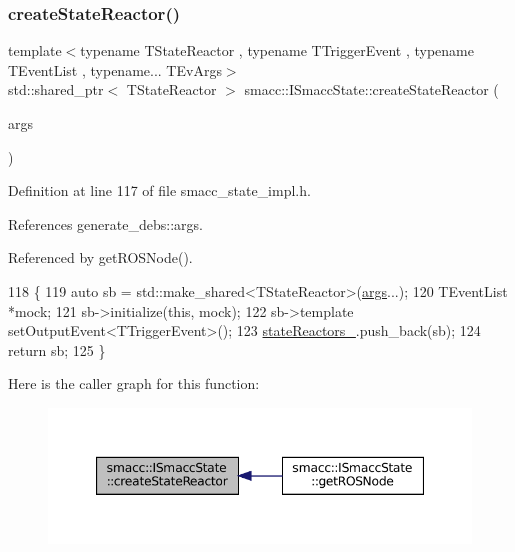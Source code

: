 \subsubsection{\texorpdfstring{create\+State\+Reactor()}{createStateReactor()}\hspace{0.1cm}{\footnotesize\ttfamily [1/2]}}
{\footnotesize\ttfamily template$<$typename T\+State\+Reactor , typename T\+Trigger\+Event , typename T\+Event\+List , typename... T\+Ev\+Args$>$ \\
std\+::shared\+\_\+ptr$<$ T\+State\+Reactor $>$ smacc\+::\+I\+Smacc\+State\+::create\+State\+Reactor (\begin{DoxyParamCaption}\item[{T\+Ev\+Args...}]{args }\end{DoxyParamCaption})}



Definition at line 117 of file smacc\+\_\+state\+\_\+impl.\+h.



References generate\+\_\+debs\+::args.



Referenced by get\+R\+O\+S\+Node().


\begin{DoxyCode}
118 \{
119     \textcolor{keyword}{auto} sb = std::make\_shared<TStateReactor>(\hyperlink{namespacegenerate__debs_a75f9143e38df82d83b2e8a6f99cae02c}{args}...);
120     TEventList *mock;
121     sb->initialize(\textcolor{keyword}{this}, mock);
122     sb->template setOutputEvent<TTriggerEvent>();
123     \hyperlink{classsmacc_1_1ISmaccState_a7410a353b515f7b7357e94ef619a6c45}{stateReactors\_}.push\_back(sb);
124     \textcolor{keywordflow}{return} sb;
125 \}
\end{DoxyCode}
Here is the caller graph for this function\+:
\nopagebreak
\begin{figure}[H]
\begin{center}
\leavevmode
\includegraphics[width=347pt]{classsmacc_1_1ISmaccState_a5b071f3034e2a0416d87ff26332f598f_icgraph}
\end{center}
\end{figure}
\mbox{\label{classsmacc_1_1ISmaccState_a92bba7b456f026467f23c3cd6ceb5985}} 
